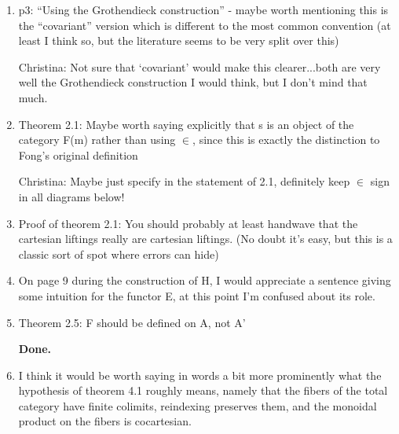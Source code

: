 \documentclass[reqno]{amsart}
\def\chris{\color{purple} Christina: }
\begin{document}
\begin{enumerate}
{\color{blue}{Kenny: They might not mean $gf$ specifically, but there are many instances where we don't use a $\circ$ for functional composition, e.g. when we're pushing forward a graph structure over a map $f$ of vertices towards the top of page 21. Do we want to use a $\circ$ or not?}}

\item p3: “Using the Grothendieck construction” - maybe worth mentioning this is the “covariant” version which is different to the most common 
convention 
(at least I think so, but the literature seems to be very split over this)

{\chris Not sure that `covariant' would make this clearer...both are very well the Grothendieck construction I would think, but I don't mind that 
much.}

\item Theorem 2.1: Maybe worth saying explicitly that s is an object of the category F(m) rather than using $\in$, since this is exactly the 
distinction to 
Fong’s original definition

{\chris Maybe just specify in the statement of 2.1, definitely keep $\in$ sign in all diagrams below!}

\item Proof of theorem 2.1: You should probably at least handwave that the cartesian liftings really are cartesian liftings. (No doubt it’s easy, but 
this 
is a classic sort of spot where errors can hide)

\item On page 9 during the construction of H, I would appreciate a sentence giving some intuition for the functor E, at this point I’m confused about 
its 
role.

{}

\item Theorem 2.5: F should be defined on A, not A’

{\bf Done.}

\item I think it would be worth saying in words a bit more prominently what the hypothesis of theorem 4.1 roughly means, namely that the fibers of 
the total 
category have finite colimits, reindexing preserves them, and the monoidal product on the fibers is cocartesian.


\end{enumerate}
\end{document}
